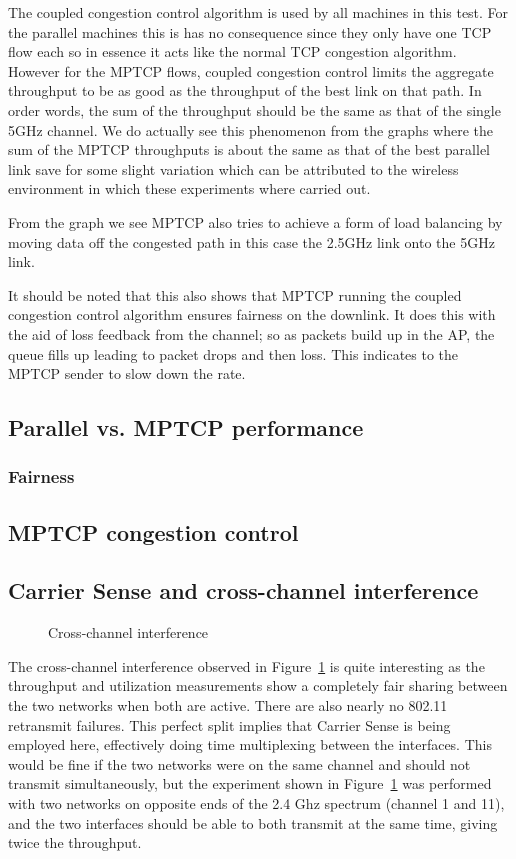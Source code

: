 \documentclass[12pt,a4paper]{article}
\begin{document}
The coupled congestion control algorithm is used by all machines in this test.
For the parallel machines this is has no consequence since they only have one
TCP flow each so in essence it acts like the normal TCP congestion algorithm.
However for the MPTCP flows, coupled congestion control limits the aggregate
throughput to be as good as the throughput of the best link on that path. In
order words, the sum of the throughput should be the same as that of the single
5GHz channel. We do actually see this phenomenon from the graphs where the sum
of the MPTCP throughputs is about the same as that of the best parallel link
save for some slight variation which can be attributed to the wireless
environment in which these experiments where carried out.

From the graph we see MPTCP also tries to achieve a form of load balancing by
moving data off the congested path in this case the 2.5GHz link onto the 5GHz
link.

It should be noted that this also shows that MPTCP running the coupled
congestion control algorithm ensures fairness on the downlink. It does this with
the aid of loss feedback from the channel; so as packets build up in the AP, the
queue fills up leading to packet drops and then loss. This indicates to the
MPTCP sender to slow down the rate.

\subsection{Parallel vs. MPTCP performance}
\subsubsection{Fairness}
\subsection{MPTCP congestion control}
\subsection{Carrier Sense and cross-channel interference}
\begin{figure}[h]
 \centering
 
 \caption{Cross-channel interference}\label{graph:cc-interference}
\end{figure}

The cross-channel interference observed in Figure~\ref{graph:cc-interference} is
quite interesting as the throughput and utilization measurements show a
completely fair sharing between the two networks when both are active. There are
also nearly no 802.11 retransmit failures. This perfect split implies that
Carrier Sense is being employed here, effectively doing time multiplexing
between the interfaces.  This would be fine if the two networks were on the same
channel and should not transmit simultaneously, but the experiment shown in
Figure~\ref{graph:cc-interference} was performed with two networks on opposite
ends of the 2.4 Ghz spectrum (channel 1 and 11), and the two interfaces should
be able to both transmit at the same time, giving twice the throughput.
\end{document}

